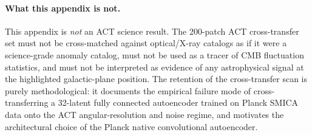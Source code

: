 \documentclass[aps,prd,twocolumn,superscriptaddress,showpacs,preprintnumbers,nofootinbib,longbibliography,floatfix]{revtex4-2}
\begin{document}
\paragraph{What this appendix is not.} This appendix is \emph{not} an ACT science result. The 200-patch ACT cross-transfer set must not be cross-matched against optical/X-ray catalogs as if it were a science-grade anomaly catalog, must not be used as a tracer of CMB fluctuation statistics, and must not be interpreted as evidence of any astrophysical signal at the highlighted galactic-plane position. The retention of the cross-transfer scan is purely methodological: it documents the empirical failure mode of cross-transferring a 32-latent fully connected autoencoder trained on Planck SMICA data onto the ACT angular-resolution and noise regime, and motivates the architectural choice of the Planck native convolutional autoencoder.
\end{document}
